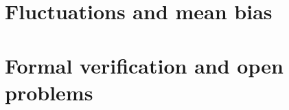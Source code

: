 \documentclass[12pt,oneside,openany]{book}
\theoremstyle{definition}
\theoremstyle{plain}
\numberwithin{equation}{chapter}
\theoremstyle{plain}
\theoremstyle{definition}
\theoremstyle{remark}
\begin{document}
\part{Fluctuations and mean bias}\label{part:fluct}


\part{Formal verification and open problems}\label{part:formal}



\backmatter

\setlength{\bibsep}{3pt plus 1pt minus 1pt}


\end{document}
